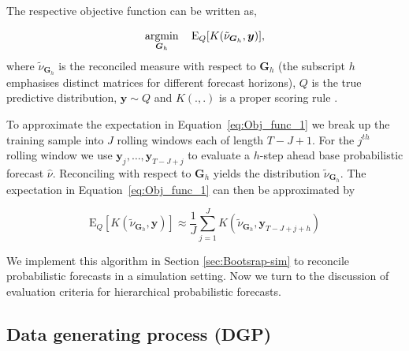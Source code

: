 \documentclass[12pt]{article}
\def\E{\text{E}}
\theoremstyle{definition}
\begin{document}
{\color{blue} The respective objective function can be written as,

\begin{equation} \label{eq:Obj_func_1}
\operatornamewithlimits{argmin}_{\bm{G}_h} \quad \E_{Q}[K(\tilde{\nu}_{\bm{G}_h}, \bm{y})],
\end{equation}
where $\tilde{\nu}_{\bm{G}_h}$ is the reconciled measure with respect to $\bm{G}_h$ (the subscript $h$ emphasises distinct matrices for different forecast horizons), $Q$ is the true predictive distribution, $\bm{y}\sim Q$ and $K(.,.)$ is a proper scoring rule \citep[see][and references therein]{Gneiting2007,Gneiting2014}.  

To approximate the expectation in Equation~\ref{eq:Obj_func_1} we break up the training sample into $J$ rolling windows each of length $T-J+1$.  For the $j^{th}$ rolling window we use $\bm{y}_{j},\ldots,\bm{y}_{T-J+j}$ to evaluate a $h$-step ahead base probabilistic forecast $\hat{\nu}$.  Reconciling with respect to $\bm{G}_h$ yields the distribution $\tilde{\nu}_{\bm{G}_h}$.  The expectation in Equation~\ref{eq:Obj_func_1} can then be approximated by

\begin{equation} \label{eq:Obj_func_apprx} \E_{Q}[K(\tilde{\nu}_{\bm{G}_h}, \bm{y})]\approx\frac{1}{J}\sum_{j=1}^{J}K(\tilde{\nu}_{\bm{G}_h},\bm{y}_{T-J+j+h})\nonumber
\end{equation}




We implement this algorithm in Section \ref{sec:Bootsrap-sim} to reconcile probabilistic forecasts in a simulation setting. Now we turn to the discussion of evaluation criteria for hierarchical probabilistic forecasts.}


\subsection{Data generating process (DGP)} \label{subsec:DGP}
\end{document}
